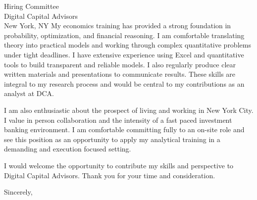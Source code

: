 \documentclass[11pt]{letter}
\begin{document}
\begin{letter}{Hiring Committee \\ Digital Capital Advisors \\ New York, NY}
My economics training has provided a strong foundation in probability, optimization, and financial reasoning. I am comfortable translating theory into practical models and working through complex quantitative problems under tight deadlines. I have extensive experience using Excel and quantitative tools to build transparent and reliable models. I also regularly produce clear written materials and presentations to communicate results. These skills are integral to my research process and would be central to my contributions as an analyst at DCA.

I am also enthusiastic about the prospect of living and working in New York City. I value in person collaboration and the intensity of a fast paced investment banking environment. I am comfortable committing fully to an on-site role and see this position as an opportunity to apply my analytical training in a demanding and execution focused setting.

I would welcome the opportunity to contribute my skills and perspective to Digital Capital Advisors. Thank you for your time and consideration.

\closing{Sincerely,}

\end{letter}
\end{document}
